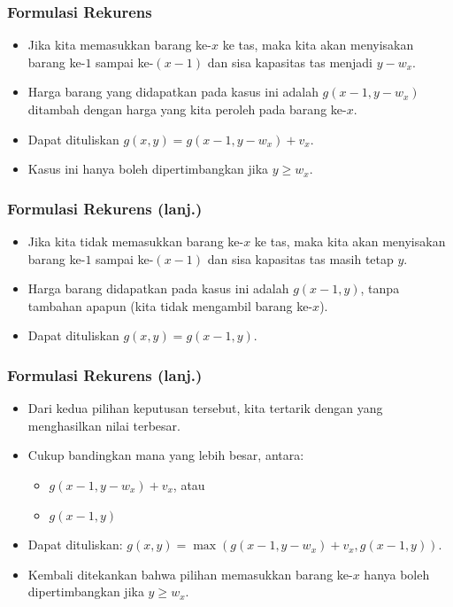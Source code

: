 \begin{frame} 
\frametitle{Formulasi Rekurens}
\begin{itemize}
  \item Jika kita memasukkan barang ke-$x$ ke tas, maka kita akan menyisakan barang ke-$1$ sampai ke-$(x-1)$ dan sisa kapasitas tas menjadi $y-w_x$. 
  \item Harga barang yang didapatkan pada kasus ini adalah $g(x-1,y-w_x)$ ditambah dengan harga yang kita peroleh pada barang ke-$x$.
  \item Dapat dituliskan $g(x, y) = g(x-1, y-w_x) + v_x$.
  \item Kasus ini hanya boleh dipertimbangkan jika $y \geq w_x$.
\end{itemize}
\end{frame}

\begin{frame} 
\frametitle{Formulasi Rekurens (lanj.)}
\begin{itemize}
  \item Jika kita tidak memasukkan barang ke-$x$ ke tas, maka kita akan menyisakan barang ke-$1$ sampai ke-$(x-1)$ dan sisa kapasitas tas masih tetap $y$.
  \item Harga barang didapatkan pada kasus ini adalah $g(x-1,y)$, tanpa tambahan apapun (kita tidak mengambil barang ke-$x$).
  \item Dapat dituliskan $g(x, y) = g(x-1, y)$.
\end{itemize}
\end{frame}

\begin{frame} 
\frametitle{Formulasi Rekurens (lanj.)}
\begin{itemize}
  \item Dari kedua pilihan keputusan tersebut, kita tertarik dengan yang menghasilkan nilai terbesar.
  \item Cukup bandingkan mana yang lebih besar, antara:
  \begin{itemize}
    \item $g(x-1, y-w_x) + v_x$, atau
    \item $g(x-1, y)$
  \end{itemize}
  \item Dapat dituliskan: $g(x, y) = \max(g(x-1,y-w_x)+v_x,g(x-1,y))$. \newline
  \item Kembali ditekankan bahwa pilihan memasukkan barang ke-$x$ hanya boleh dipertimbangkan jika $y \geq w_x$.
\end{itemize}
\end{frame}

